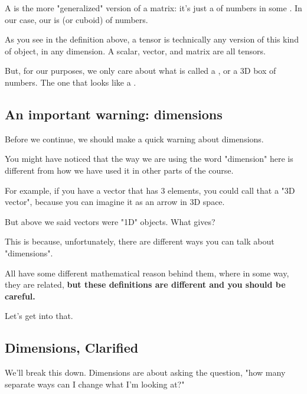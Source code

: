         \begin{definition}
            A  is the more "generalized" version of a matrix: it's just a  of numbers in some . In our case, our  is  (or cuboid) of numbers.
        \end{definition}
        
         
        
        As you see in the definition above, a tensor is technically any version of this kind of object, in any dimension. A scalar, vector, and matrix are all tensors.
        
        But, for our purposes, we only care about what is called a , or a 3D box of numbers. The one that looks like a .
        
    \subsection{An important warning: dimensions}
    
        Before we continue, we should make a quick warning about dimensions.
        
        You might have noticed that the way we are using the word "dimension" here is different from how we have used it in other parts of the course.
        
        For example, if you have a vector that has 3 elements, you could call that a "3D vector", because you can imagine it as an arrow in 3D space.
        
        But above we said vectors were "1D" objects. What gives?
        
        This is because, unfortunately, there are different ways you can talk about "dimensions".
        
        All have some different mathematical reason behind them, where in some way, they are related, \textbf{but these definitions are different and you should be careful.}
        
        Let's get into that.
        
    \subsection{Dimensions, Clarified}
    
        We'll break this down. Dimensions are about asking the question, "how many separate ways can I change what I'm looking at?"
        

